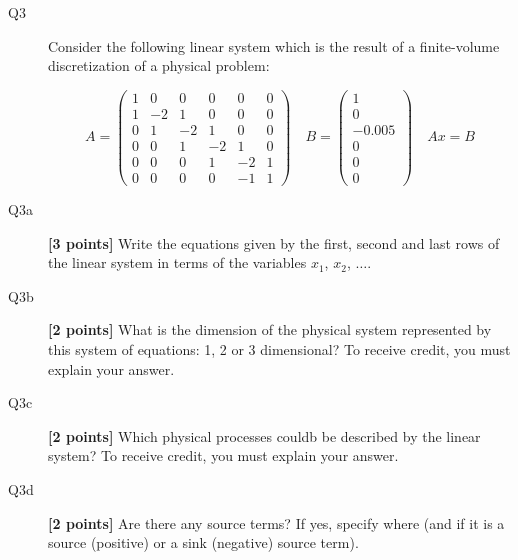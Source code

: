 \documentclass{article}
\begin{document}
\begin{description}


\item[Q3] Consider the following linear system which is the result of a finite-volume discretization of a physical problem:

\begin{equation}
A = \left( \begin{array}{cccccc}
    1 & 0 & 0 & 0 & 0 & 0 \\
    1 & -2 & 1 & 0 & 0 & 0 \\
    0 & 1 & -2 & 1  & 0 & 0 \\
    0 & 0 & 1 & -2 & 1  & 0 \\
    0 & 0 & 0 & 1 & -2 & 1  \\
    0 & 0 & 0 & 0 & -1 & 1 
\end{array}
\right) \quad B = \left( \begin{array}{c}
    1  \\
    0 \\
    -0.005 \\
    0  \\
    0  \\
    0  
\end{array} \right)  \quad Ax=B
\end{equation} 


\item [Q3a]  \textbf{[3 points]} Write the equations given by the first, second and last rows of the linear system in terms of the variables $x_1$, $x_2$, $\ldots$. 

\vspace{2cm}
\item [Q3b]  \textbf{[2 points]} What is the dimension of the physical system represented by this system of equations: 1, 2 or 3 dimensional? To receive credit, you must explain your answer.  
\vspace{2cm}

\item [Q3c] \textbf{[2 points]} Which physical processes couldb be described by the linear system?  To receive credit, you must explain your answer.
\vspace{2cm}

\item [Q3d]  \textbf{[2 points]} Are there any source terms? If yes, specify where (and if it is a source (positive) or a sink (negative) source term).
\vspace{2cm}


\end{description}
\end{document}
